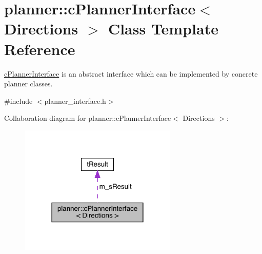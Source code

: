 \hypertarget{classplanner_1_1c_planner_interface}{}\section{planner\+:\+:c\+Planner\+Interface$<$ Directions $>$ Class Template Reference}
\label{classplanner_1_1c_planner_interface}


\mbox{\hyperlink{classplanner_1_1c_planner_interface}{c\+Planner\+Interface}} is an abstract interface which can be implemented by concrete planner classes.  




{\ttfamily \#include $<$planner\+\_\+interface.\+h$>$}



Collaboration diagram for planner\+:\+:c\+Planner\+Interface$<$ Directions $>$\+:
\nopagebreak
\begin{figure}[H]
\begin{center}
\leavevmode
\includegraphics[width=213pt]{classplanner_1_1c_planner_interface__coll__graph}
\end{center}
\end{figure}
